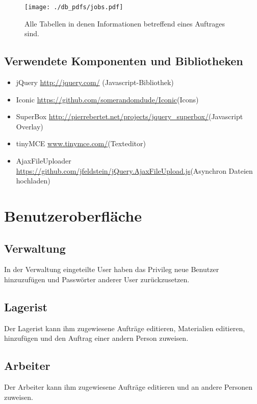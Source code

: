 \documentclass[ngerman, 12pt, pdftex]{scrartcl}[2006/07/30]
\begin{document}
\begin{figure}[h!p]
	\centering
	\texttt{[image: ./db\_pdfs/jobs.pdf]}
	\caption{Alle Tabellen in denen Informationen betreffend eines Auftrages sind.}
\end{figure}



\newpage

\subsection{Verwendete Komponenten und Bibliotheken} %
\begin{itemize}
\item jQuery \url{http://jquery.com/} (Javascript-Bibliothek)
\item Iconic \url{https://github.com/somerandomdude/Iconic}(Icons)
\item SuperBox \url{http://pierrebertet.net/projects/jquery_superbox/}(Javascript Overlay)
\item tinyMCE \url{www.tinymce.com/}(Texteditor)
\item AjaxFileUploader \url{https://github.com/jfeldstein/jQuery.AjaxFileUpload.js}(Asynchron Dateien hochladen)
\end{itemize}



\section{Benutzeroberfläche}
\subsection{Verwaltung}
In der Verwaltung eingeteilte User haben das Privileg neue Benutzer hinzuzufügen und Passwörter anderer User zurückzusetzen.
\subsection{Lagerist}
Der Lagerist kann ihm zugewiesene Aufträge editieren, Materialien editieren, hinzufügen und den Auftrag einer andern Person zuweisen.


\subsection{Arbeiter}
Der Arbeiter kann ihm zugewiesene Aufträge editieren und an andere Personen zuweisen.
\end{document}
